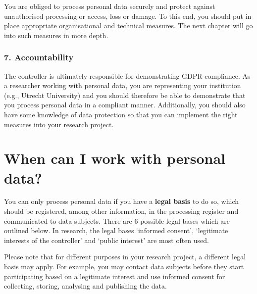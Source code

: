 \documentclass[
]{book}
\begin{document}
You are obliged to process personal data securely and protect against unauthorised processing or access, loss or damage. To this end, you should put in place appropriate organisational and technical measures. The next chapter will go into such measures in more depth.

\hypertarget{accountability}{%
\subsubsection{7. Accountability}\label{accountability}}

The controller is ultimately responsible for demonstrating GDPR-compliance. As a researcher working with personal data, you are representing your institution (e.g., Utrecht University) and you should therefore be able to demonstrate that you process personal data in a compliant manner. Additionally, you should also have some knowledge of data protection so that you can implement the right measures into your research project.

\hypertarget{legal-basis}{%
\section*{When can I work with personal data?}\label{legal-basis}}

You can only process personal data if you have a \textbf{legal basis} to do so, which should be registered, among other information, in the processing register and communicated to data subjects. There are 6 possible legal bases which are outlined below. In research, the legal bases `informed consent', `legitimate interests of the controller' and `public interest' are most often used.

Please note that for different purposes in your research project, a different legal basis may apply. For example, you may contact data subjects before they start participating based on a legitimate interest and use informed consent for collecting, storing, analysing and publishing the data.
\end{document}
